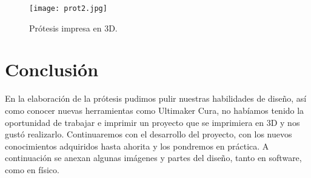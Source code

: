 \documentclass[a4paper]{article}
\begin{document}
\begin{figure}[H]
\centering
\texttt{[image: prot2.jpg]}
\caption{\label{fig:biomec1}Prótesis impresa en 3D.}
\end{figure}

\newline
\section{Conclusi\'on}
En la elaboración de la prótesis pudimos pulir nuestras habilidades de diseño, así como conocer nuevas herramientas como Ultimaker Cura, no habíamos tenido la oportunidad de trabajar e imprimir un proyecto que se imprimiera en 3D y nos gustó realizarlo. Continuaremos con el desarrollo del proyecto, con los nuevos conocimientos adquiridos hasta ahorita y los pondremos en práctica.
\newline
A continuación se anexan algunas imágenes y partes del diseño, tanto en software, como en físico.
\end{document}
